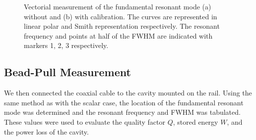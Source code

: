 \documentclass[a4paper]{article}
\numberwithin{equation}{section}
\begin{document}
\begin{figure}[hbt!]
	\centering
	\quad

	\caption{Vectorial measurement of the fundamental resonant mode (a) without
	and (b) with calibration. The curves are represented in linear polar and
	Smith representation respectively. The resonant frequency and points at
	half of the FWHM are indicated with markers 1, 2, 3 respectively.
	}
	\label{fig:vectorial_raw}
\end{figure}

\subsection{Bead-Pull Measurement}
 

We then connected the coaxial cable to the cavity mounted on the rail. Using the
same method as with the scalar case, the location of the fundamental resonant
mode was determined and the resonant frequency and FWHM was tabulated. These
values were used to evaluate the quality factor $Q$, stored energy $W$, and the
power loss of the cavity. \par 
\end{document}

